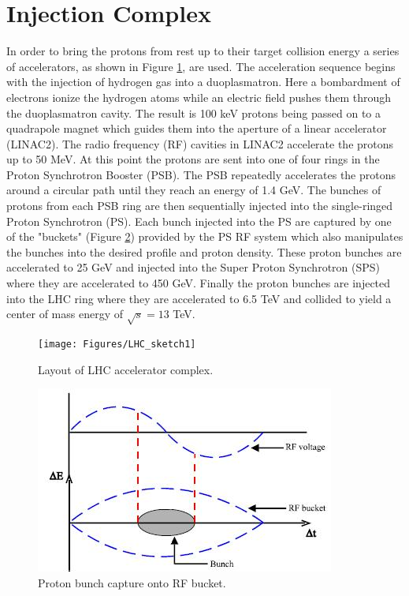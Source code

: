 \section{Injection Complex}
In order to bring the protons from rest up to their target collision energy a series of accelerators, as shown in Figure \ref{fig:lhcsketch}, are used.  The acceleration sequence begins with the injection of hydrogen gas into a duoplasmatron.  Here a bombardment of electrons ionize the hydrogen atoms while an electric field pushes them through the duoplasmatron cavity. The result is 100 keV protons being passed on to a quadrapole magnet which guides them into the aperture of a linear accelerator (LINAC2).  The radio frequency (RF) cavities in LINAC2 accelerate the protons up to 50 MeV.  At this point the protons are sent into one of four rings in the Proton Synchrotron Booster (PSB).  The PSB repeatedly accelerates the protons around a circular path until they reach an energy of 1.4 GeV.  The bunches of protons from each PSB ring are then sequentially injected into the single-ringed Proton Synchrotron (PS).  Each bunch injected into the PS are captured by one of the "buckets" (Figure \ref{fig:rfbucket}) provided by the PS RF system which also manipulates the bunches into the desired profile and proton density. These proton bunches are accelerated to 25 GeV and injected into the Super Proton Synchrotron (SPS) where they are accelerated to 450 GeV.  Finally the proton bunches are injected into the LHC ring where they are accelerated to 6.5 TeV and collided to yield a center of mass energy of $\sqrt{s} = 13$ TeV.

\begin{figure}[h]
	\centering
	\texttt{[image: Figures/LHC\_sketch1]}
	\caption{Layout of LHC accelerator complex.}
	\label{fig:lhcsketch}
\end{figure}

\begin{figure}[h]
	\centering
	\includegraphics[width=0.7\linewidth]{Figures/RFbucket}
	\caption{Proton bunch capture onto RF bucket.}
	\label{fig:rfbucket}
\end{figure}


